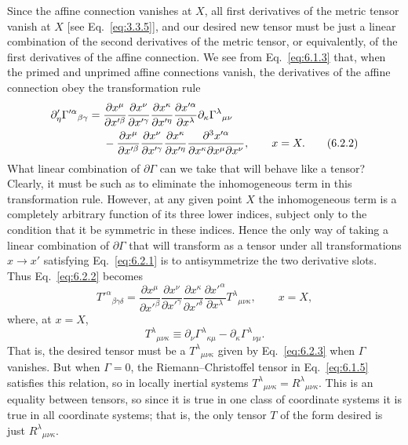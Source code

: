 Since the affine connection vanishes at \(X\), all first derivatives of the
metric tensor vanish at \(X\) [see Eq.~\eqref{eq:3.3.5}], and our desired new
tensor must be just a linear combination of the second derivatives of the
metric tensor, or equivalently, of the first derivatives of the affine
connection. We see from Eq.~\eqref{eq:6.1.3} that, when the primed and
unprimed affine connections vanish, the derivatives of the affine connection
obey the transformation rule
\begin{align}
  \partial'_\eta\Gamma'^\alpha{}_{\beta\gamma}
  ={}&
  \frac{\partial x^\mu}{\partial x'^\beta}
  \frac{\partial x^\nu}{\partial x'^\gamma}
  \frac{\partial x^\kappa}{\partial x'^\eta}
  \frac{\partial x'^\alpha}{\partial x^\lambda}
  \partial_\kappa\Gamma^\lambda{}_{\mu\nu}
  \notag\\
  &-
  \frac{\partial x^\mu}{\partial x'^\beta}
  \frac{\partial x^\nu}{\partial x'^\gamma}
  \frac{\partial x^\kappa}{\partial x'^\eta}
  \frac{\partial^3x'^\alpha}
       {\partial x^\kappa\partial x^\mu\partial x^\nu},
  \qquad x=X.
  \tag{6.2.2}\label{eq:6.2.2}
\end{align}
What linear combination of \(\partial\Gamma\) can we take that will behave
like a tensor? Clearly, it must be such as to eliminate the inhomogeneous term
in this transformation rule. However, at any given point \(X\) the
inhomogeneous term is a completely arbitrary function of its three lower
indices, subject only to the condition that it be symmetric in these indices.
Hence the only way of taking a linear combination of \(\partial\Gamma\) that
will transform as a tensor under all transformations \(x\to x'\) satisfying
Eq.~\eqref{eq:6.2.1} is to antisymmetrize the two derivative slots. Thus
Eq.~\eqref{eq:6.2.2} becomes
\[
  T'^\alpha{}_{\beta\gamma\delta}
  =
  \frac{\partial x^\mu}{\partial x'^\beta}
  \frac{\partial x^\nu}{\partial x'^\gamma}
  \frac{\partial x^\kappa}{\partial x'^\delta}
  \frac{\partial x'^\alpha}{\partial x^\lambda}
  T^\lambda{}_{\mu\nu\kappa},
  \qquad x=X,
\]
where, at \(x=X\),
\begin{equation}
  T^\lambda{}_{\mu\nu\kappa}
  \equiv
  \partial_\nu\Gamma^\lambda{}_{\kappa\mu}
  -\partial_\kappa\Gamma^\lambda{}_{\nu\mu}.
  \tag{6.2.3}\label{eq:6.2.3}
\end{equation}
That is, the desired tensor must be a
\(T^\lambda{}_{\mu\nu\kappa}\) given by Eq.~\eqref{eq:6.2.3} when
\(\Gamma\) vanishes. But when \(\Gamma=0\), the
Riemann--Christoffel tensor in Eq.~\eqref{eq:6.1.5} satisfies this relation, so
in locally inertial systems
\(T^\lambda{}_{\mu\nu\kappa}=R^\lambda{}_{\mu\nu\kappa}\). This is an
equality between tensors, so since it is true in one class of coordinate
systems it is true in all coordinate systems; that is, the only tensor \(T\)
of the form desired is just \(R^\lambda{}_{\mu\nu\kappa}\).

